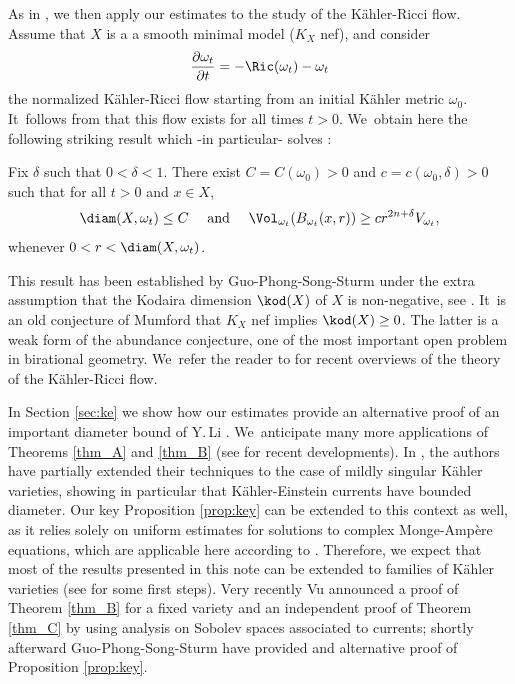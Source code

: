 As in \cite{GPSS22}, we then apply our estimates to the study of the Kähler-Ricci flow.
Assume that $X$ is a a smooth minimal model ($K_X$ nef), and consider\vspace*{-3pt}
\[
\frac{\partial \omega_t}{\partial t}=-\Ric(\omega_t)-\omega_t
\]
the normalized Kähler-Ricci flow starting from an initial Kähler metric $\omega_0$. It~follows from \cite{TZ06} that this flow exists for all times $t>0$. We~obtain here the following striking result which -in particular- solves \cite[Conj.\,6.2]{Tos18}:

\begin{thmA}\label{thm_C}
Fix $\delta$ such that $0<\delta<1$.
There exist $C=C(\omega_0)>0$ and $c=c(\omega_0,\delta)>0$ such that for all $t>0$ and $x \in X$,\vspace*{-3pt}
\[
\diam(X,\omega_t) \leq C
\quad \text{ and } \quad
\Vol_{\omega_t}(B_{\omega_t}(x,r)) \geq c r^{2n+\delta} V_{\omega_t},
\]
whenever $0<r<\diam(X,\omega_t)$.
\end{thmA}

This result has been established by Guo-Phong-Song-Sturm under the extra assumption that
the Kodaira dimension $\kod(X)$ of $X$ is non-negative, see \cite[Th.\,2.3]{GPSS22}. It~is an old conjecture of Mumford that $K_X$ nef implies $\kod(X) \geq 0$.
The latter is a weak form of the abundance conjecture, one of the most important open problem in
birational geometry. We~refer the reader to \cite{Tos18,Tos24} for recent overviews of the theory of the Kähler-Ricci flow.

In Section \ref{sec:ke} we show how our estimates provide an alternative proof of an important
diameter bound of Y.\,Li \cite[Th.\,1.4]{Li23}. We~anticipate many more applications of Theorems \ref{thm_A} and \ref{thm_B} (see \cite{CGNPPW23,GP24} for recent developments).
In \cite{GPSS23}, the authors have partially extended their techniques
to the case of mildly singular Kähler varieties, showing in particular that Kähler-Einstein currents have
bounded diameter. Our key Proposition \ref{prop:key} can be extended to this context as well, as it relies solely
on uniform estimates for solutions to complex Monge-Ampère equations,
which are applicable here according to \cite[Th.\,1.9]{DnGG23}.
Therefore, we expect that most of the results presented in this note can be extended to families of
Kähler varieties (see \cite[\S 3]{GP24} for some first steps).
Very recently Vu \cite{V24} announced a proof of Theorem \ref{thm_B} for a fixed variety
and an independent proof of Theorem \ref{thm_C} by using analysis on Sobolev spaces associated to currents;
shortly afterward Guo-Phong-Song-Sturm \cite{GPSS24} have provided and alternative proof of Proposition \ref{prop:key}.

